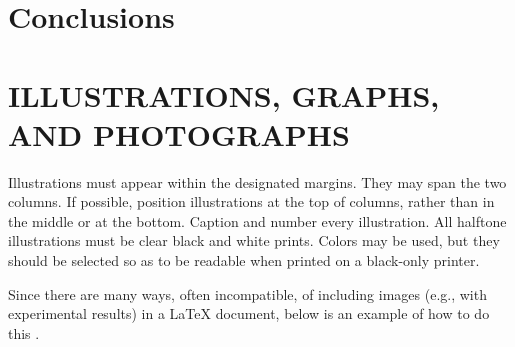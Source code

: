 \documentclass{article}
\begin{document}
\section{Conclusions}
\label{sec:conclusions}


\section{ILLUSTRATIONS, GRAPHS, AND PHOTOGRAPHS}
\label{sec:illust}

Illustrations must appear within the designated margins.  They may span the two
columns.  If possible, position illustrations at the top of columns, rather
than in the middle or at the bottom.  Caption and number every illustration.
All halftone illustrations must be clear black and white prints.  Colors may be
used, but they should be selected so as to be readable when printed on a
black-only printer.

Since there are many ways, often incompatible, of including images (e.g., with
experimental results) in a LaTeX document, below is an example of how to do
this \cite{Lamp86}.


%


\end{document}
